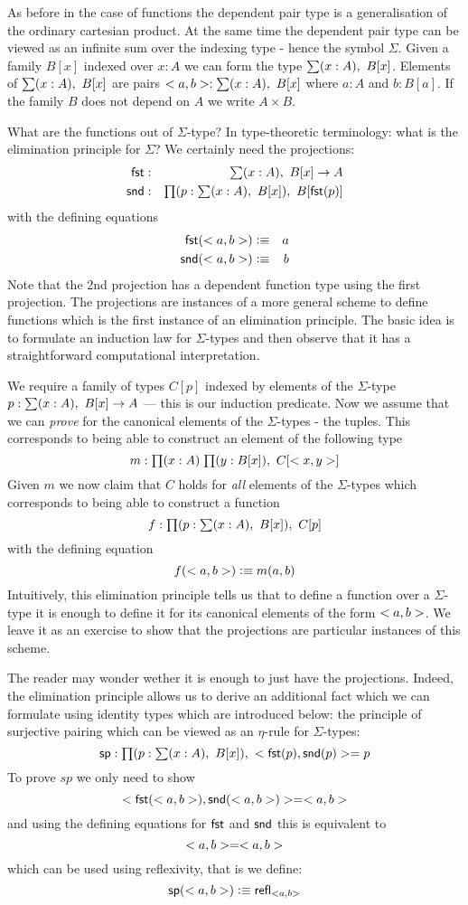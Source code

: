 As before in the case of functions the dependent pair type is a
generalisation of the ordinary cartesian product. At the same time 
the dependent pair type can be viewed as an infinite sum over the
indexing type - hence  the symbol $\Sigma$. Given a family $B[x]$
indexed over $x:A$ we can form the type $\sm{x:A}B[x]$. Elements of $\sm{x:A}B[x]$ are
pairs $\tup{a}{b} : \sm{x:A}B[x]$ where $a:A$ and $b:B[a]$. If the
family $B$ does not depend on $A$ we write $A \times B$.

What are the functions out of $\Sigma$-type? In type-theoretic
terminology: what is the elimination principle for $\Sigma$? We certainly need the projections:
\begin{eqnarray*}
  \fst & : & \sm{x : A}B[x] \to A \\
  \snd & : & \prd{p:\sm{x : A}B[x]}B[\fst(p)]
\end{eqnarray*}
with the defining equations 
\begin{eqnarray*}
  \mathsf{fst}(<a,b>) & \vcentcolon\equiv & a \\
  \mathsf{snd}(<a,b>) & \vcentcolon\equiv & b
\end{eqnarray*}
Note that the 2nd projection has a dependent function type using the
first projection. The projections are instances of a more general
scheme to define functions which is the first instance of an
elimination principle. The basic idea is to formulate an induction law
for $\Sigma$-types and then observe that it has a straightforward
computational interpretation.

We require a family of types $C[p]$ indexed by elements of the
$\Sigma$-type $p : \sm{x : A}B[x] \to A$ --- this is our induction
predicate. Now we assume that we can \emph{prove} for the canonical
elements of the $\Sigma$-types - the tuples. This corresponds to being
able to construct an element of the following type
\[ m:\prd{x:A}{y:B[x]}C[\tup{x}{y}] \]
Given $m$ we now claim that $C$ holds for \emph{all} elements of the
$\Sigma$-types which corresponds to being able to construct a function 
\[ f : \prd{p:\sm{x : A}B[x]}C[p]\]
with the defining equation
\[ f(<a,b>) \vcentcolon\equiv m(a,b) \]
Intuitively, this elimination principle tells us that to define a
function over a $\Sigma$-type it is enough to define it for its
canonical elements of the form $<a,b>$. We leave it as an
exercise to show that the projections are particular instances of this
scheme. 

The reader may wonder wether it is enough to just have the
projections. Indeed, the elimination principle allows us to derive an
additional fact which we can formulate using identity types which are
introduced below: the principle of surjective pairing which can be
viewed as an $\eta$-rule for $\Sigma$-types:
\[ \spr : \prd{p : \sm{x:A} B[x]} \tup{\fst(p)}{\snd(p)} = p \]
To prove $sp$ we only need to show
\[ <\mathsf{fst}(<a,b>),\mathsf{snd}(<a,b>)> = <a,b> \]
and using the defining equations for $\mathsf{fst}$ and $\mathsf{snd}$ this is
equivalent to
\[ <a,b> = <a,b> \]
which can be used using reflexivity, that is we define:
\[ \mathsf{sp}(<a,b>) \vcentcolon\equiv \mathsf{refl}_{<a,b>} \]

